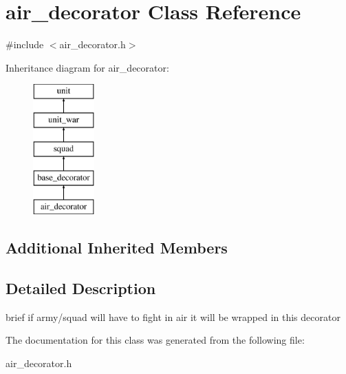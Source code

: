 \hypertarget{classair__decorator}{}\section{air\+\_\+decorator Class Reference}
\label{classair__decorator}


{\ttfamily \#include $<$air\+\_\+decorator.\+h$>$}

Inheritance diagram for air\+\_\+decorator\+:\begin{figure}[H]
\begin{center}
\leavevmode
\includegraphics[height=5.000000cm]{classair__decorator}
\end{center}
\end{figure}
\subsection*{Additional Inherited Members}


\subsection{Detailed Description}
brief if army/squad will have to fight in air it will be wrapped in this decorator 

The documentation for this class was generated from the following file\+:\begin{DoxyCompactItemize}
\item 
air\+\_\+decorator.\+h\end{DoxyCompactItemize}
